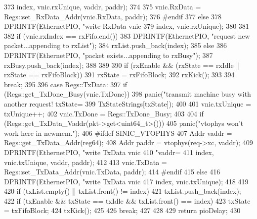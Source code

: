 \begin{DoxyCode}
{{{373                     index, vnic.rxUnique, vaddr, paddr);
374 
375             vnic.RxData = Regs::set_RxData_Addr(vnic.RxData, paddr);
376 #endif
377         } else {
378             DPRINTF(EthernetPIO, "write RxData vnic %
379                     index, vnic.rxUnique);
380         }
381 
382         if (vnic.rxIndex == rxFifo.end()) {
383             DPRINTF(EthernetPIO, "request new packet...appending to rxList\n");
384             rxList.push_back(index);
385         } else {
386             DPRINTF(EthernetPIO, "packet exists...appending to rxBusy\n");
387             rxBusy.push_back(index);
388         }
389 
390         if (rxEnable && (rxState == rxIdle || rxState == rxFifoBlock)) {
391             rxState = rxFifoBlock;
392             rxKick();
393         }
394         break;
395 
396       case Regs::TxData:
397         if (Regs::get_TxDone_Busy(vnic.TxDone))
398             panic("transmit machine busy with another request! txState=%
399                   TxStateStrings[txState]);
400 
401         vnic.txUnique = txUnique++;
402         vnic.TxDone = Regs::TxDone_Busy;
403 
404         if (Regs::get_TxData_Vaddr(pkt->get<uint64_t>())) {
405             panic("vtophys won't work here in newmem.\n");
406 #ifdef SINIC_VTOPHYS
407             Addr vaddr = Regs::get_TxData_Addr(reg64);
408             Addr paddr = vtophys(req->xc, vaddr);
409             DPRINTF(EthernetPIO, "write TxData vnic %
410                     "vaddr=%
411                     index, vnic.txUnique, vaddr, paddr);
412 
413             vnic.TxData = Regs::set_TxData_Addr(vnic.TxData, paddr);
414 #endif
415         } else {
416             DPRINTF(EthernetPIO, "write TxData vnic %
417                     index, vnic.txUnique);
418         }
419 
420         if (txList.empty() || txList.front() != index)
421             txList.push_back(index);
422         if (txEnable && txState == txIdle && txList.front() == index) {
423             txState = txFifoBlock;
424             txKick();
425         }
426         break;
427     }
428 
429     return pioDelay;
430 }
\end{DoxyCode}


